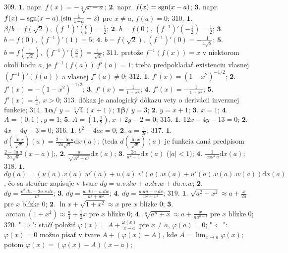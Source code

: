 $\boxed{309.}$ $\boldsymbol{1.}$ napr. $f(x)=-\sqrt[3]{x-a}$;
$\boldsymbol{2.}$ napr. $f(x)=\operatorname{sgn} (x-a)$;
$\boldsymbol{3.}$ napr. $f(x)=\operatorname{sgn} (x-a).(\sin \frac{1}{x-a}-2)$ pre  $x \ne a $, $f(a)=0$;
$\boxed{310.}$ $\boldsymbol{1.}$ $\beta /b=f(\sqrt{2}), \, (f^{-1})'(\frac{6}{5})=\frac{1}{2}$;
$\boldsymbol{2.}$ $b=f(0), \, (f^{-1})'(-\frac{1}{2})=\frac{1}{2}$;
$\boldsymbol{3.}$ $b=f(0), \, (f^{-1})'(1)=5$; 
$\boldsymbol{4.}$ $b=f(\sqrt{2}), \, (f^{-1})'(0)= - \frac{1}{4\sqrt{2}}$;
$\boldsymbol{5.}$ $b=f(\frac{1}{\sqrt{2}}), \, (f^{-1})'(\frac{3}{4})= \frac{1}{\sqrt{2}}$;
$\boxed{311.}$ pretože $f^{-1}(f(x))=x $ v niektorom okolí bodu $a$, je $f^{-1}(f(a)).f'(a)=1 $; treba predpokladať existenciu vlasnej  $(f^{-1})'(f(a)) $ a vlasnej  $f'(a)\ne 0 $;
$\boxed{312.}$ $\boldsymbol{1.}$ $f'(x)= (1-x^{2})^{-1/2}$;
$\boldsymbol{2.}$ $f'(x)= -(1-x^{2})^{-1/2}$;
$\boldsymbol{3.}$ $f'(x)= \frac{1}{1+x^{2}}$;
$\boldsymbol{4.}$ $f'(x)= -\frac{1}{1+x^{2}}$;
$\boldsymbol{5.}$ $f'(x)= \frac{1}{x}, \, x>0$;
$\boxed{313.}$ dôkaz je analogický dôkazu vety o derivácii inverznej funkcie;
$\boxed{314.}$ $\boldsymbol{1\alpha/}$ $y= \sqrt[3]{4}(x+1)$; $\boldsymbol{1\beta/}$ $y= 3$;
$\boldsymbol{2.}$ $y= x+1$;
$\boldsymbol{3.}$ $x=1$;
$\boldsymbol{4.}$ $A=(0,1), y=1$;
$\boldsymbol{5.}$ $A=(1,\frac{1}{2}), x+2y-2=0$;
$\boxed{315.}$ $\boldsymbol{1.}$ $12x-4y-13=0$;
$\boldsymbol{2.}$ $4x-4y+3=0$;
$\boxed{316.}$ $\boldsymbol{1.}$ $b^{2}-4ac=0$;
$\boldsymbol{2.}$ $a=\frac{1}{2e}$;
$\boxed{317.}$ $\boldsymbol{1.}$ $d(\frac{\ln x}{\sqrt{x}})(a)=\frac{2- \ln a}{2a\sqrt{a}}\mathrm{d}x (a)$; (teda  $d(\frac{\ln x}{\sqrt{x}})(a)$ je funkcia daná predpisom $\frac{2- \ln a}{2a\sqrt{a}}(x-a)$);,
$\boldsymbol{2.}$ $\frac{a}{\sqrt{A^{2}+a^{2}}}\mathrm{d}x (a)$;
$\boldsymbol{3.}$ $\frac{2a}{a^{2}-1}\mathrm{d}x (a)$ ($\vert a \vert <1) $;
$\boldsymbol{4.}$ $\frac{1}{\cos ^{3}a}\mathrm{d}x (a)$;
$\boxed{318.}$ $\boldsymbol{1.}$ $dy(a)=(u(a).v(a).w'(a)+u(a).v'(a).w(a)+u'(a).v(a).w(a) )\mathrm{d}x (a)$, čo sa stručne zapisuje v tvare $dy=u.v.dw+u.dv.w+du.v.w$;
$\boldsymbol{2.}$ $dy=\frac{v^{2}.du-2u.v.dv}{v^{4}}$;
$\boldsymbol{3.}$ $dy=\frac{w.du-u.dw}{u^{2}+w^{2}}$;
$\boldsymbol{4.}$ $dy=\frac{u.du-v.dv}{u^{2}+v^{2}}$;
$\boxed{319.}$ $\boldsymbol{1.}$ $\sqrt{a^{2}+x^{2}}\approx a+\frac{x}{2a}$ pre $x$ blízke $0$;
$\boldsymbol{2.}$ $\ln{x}+\sqrt{1+x^{2}} \approx x$ pre $x$ blízke $0$;
$\boldsymbol{3.}$ $\arctan (1+x^{2}) \approx \frac{\pi}{4}+\frac{1}{2} x$ pre $x$ blízke $0$;
$\boldsymbol{4.}$ $\sqrt[n]{a^{n}+x}\approx a+\frac{x}{na^{n-1}}$ pre $x$ blízke $0$;
$\boxed{320.}$ "$\Rightarrow $": stačí položiť $\varphi (x)=A+\frac{\omega(x)}{x-a}$ pre $x \ne a$, $\varphi(a)=0$; "$\Leftarrow $": $\varphi(x)=0$ možno písať v tvare $A+(\varphi(x)-A)$, kde $A=\lim_{x \to a}\varphi(x)$; potom $\varphi(x)=(\varphi(x)-A)(x-a)$;
